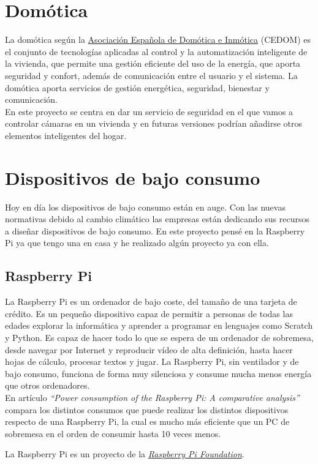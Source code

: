\section{Domótica}

La domótica \cite{domoticaCEDOM} según la \href{http://www.cedom.es/}{Asociación Española de Domótica e Inmótica} (CEDOM) es el conjunto de tecnologías aplicadas al control y la automatización inteligente de la vivienda, que permite una gestión eficiente del uso de la energía, que aporta seguridad y confort, además de comunicación entre el usuario y el sistema. La domótica aporta servicios de gestión energética, seguridad, bienestar y comunicación.\\

En este proyecto se centra en dar un servicio de seguridad en el que vamos a controlar cámaras en un vivienda y en futuras versiones podrían añadirse otros elementos inteligentes del hogar. 




\section{Dispositivos de bajo consumo}

Hoy en día los dispositivos de bajo consumo están en auge.
Con las nuevas normativas debido al cambio climático las empresas están dedicando sus recursos a diseñar dispositivos de bajo consumo. 
En este proyecto pensé en la Raspberry Pi ya que tengo una en casa y he realizado algún proyecto ya con ella.

\subsection{Raspberry Pi}

La Raspberry Pi \cite{raspPi} es un ordenador de bajo coste, del tamaño de una tarjeta de crédito. Es un pequeño dispositivo capaz de permitir a personas de todas las edades explorar la informática y aprender a programar en lenguajes como Scratch y Python. Es capaz de hacer todo lo que se espera de un ordenador de sobremesa, desde navegar por Internet y reproducir vídeo de alta definición, hasta hacer hojas de cálculo, procesar textos y jugar. La Raspberry Pi, sin ventilador y de bajo consumo, funciona de forma muy silenciosa y consume mucha menos energía que otros ordenadores.\\

En artículo \textit{``Power consumption of the Raspberry Pi: A comparative analysis''} \cite{art:raspicomsuptiom} compara los distintos consumos que puede realizar los distintos dispositivos respecto de una Raspberry Pi, la cual es mucho más eficiente que un PC de sobremesa en el orden de consumir hasta 10 veces menos.


La Raspberry Pi es un proyecto de la \href{https://www.raspberrypi.org/about/}{\textit{Raspberry Pi Foundation}}.\\










